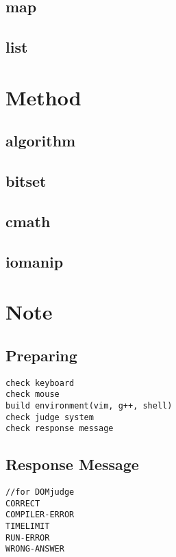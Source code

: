 \documentclass[a4paper, landscape, 8pt]{article}
\begin{document}
\begin{multicols*}{3}
\subsection{map}

\subsection{list}


\section{Method}
\subsection{algorithm}

\subsection{bitset}

\subsection{cmath}

\subsection{iomanip}


\section{Note}
\subsection{Preparing}
\begin{lstlisting}[]
check keyboard
check mouse
build environment(vim, g++, shell)
check judge system
check response message
\end{lstlisting}
\subsection{Response Message}
\begin{lstlisting}[]
//for DOMjudge
CORRECT
COMPILER-ERROR
TIMELIMIT
RUN-ERROR
WRONG-ANSWER
\end{lstlisting}

\end{multicols*}
\end{document}

